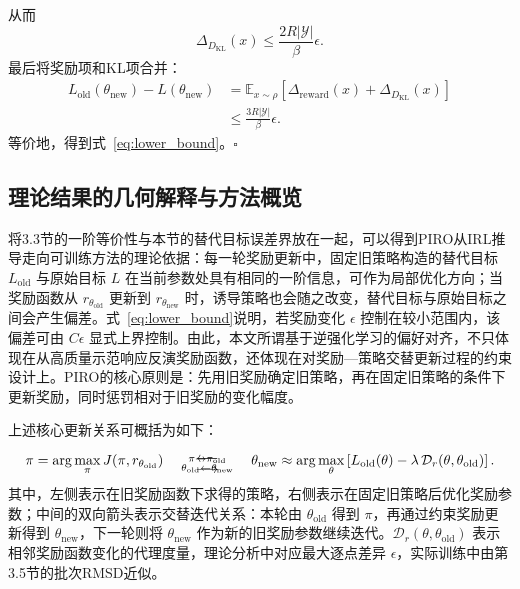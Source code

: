 从而
\begin{equation}
    \Delta_{D_{\mathrm{KL}}}(x)
    \le \frac{2R|\mathcal{Y}|}{\beta}\epsilon.
\end{equation}
最后将奖励项和KL项合并：
\begin{equation}
\begin{aligned}
    L_{\mathrm{old}}(\theta_{\mathrm{new}})-L(\theta_{\mathrm{new}})
    &=\mathbb{E}_{x\sim\rho}\left[\Delta_{\mathrm{reward}}(x)+\Delta_{D_{\mathrm{KL}}}(x)\right]\\
    &\le \frac{3R|\mathcal{Y}|}{\beta}\epsilon.
\end{aligned}
\end{equation}
等价地，得到式~\eqref{eq:lower_bound}。$\square$

\subsection{理论结果的几何解释与方法概览}

将3.3节的一阶等价性与本节的替代目标误差界放在一起，可以得到PIRO从IRL推导走向可训练方法的理论依据：每一轮奖励更新中，固定旧策略构造的替代目标 $L_{\mathrm{old}}$ 与原始目标 $L$ 在当前参数处具有相同的一阶信息，可作为局部优化方向；当奖励函数从 $r_{\theta_{\mathrm{old}}}$ 更新到 $r_{\theta_{\mathrm{new}}}$ 时，诱导策略也会随之改变，替代目标与原始目标之间会产生偏差。式~\eqref{eq:lower_bound}说明，若奖励变化 $\epsilon$ 控制在较小范围内，该偏差可由 $C\epsilon$ 显式上界控制。由此，本文所谓基于逆强化学习的偏好对齐，不只体现在从高质量示范响应反演奖励函数，还体现在对奖励—策略交替更新过程的约束设计上。PIRO的核心原则是：先用旧奖励确定旧策略，再在固定旧策略的条件下更新奖励，同时惩罚相对于旧奖励的变化幅度。

上述核心更新关系可概括为如下：
\begin{equation}
\pi
=
\arg\max_{\pi}J(\pi,r_{\theta_{\mathrm{old}}})
\quad
\mathrel{\begin{array}{@{}c@{}}
\overset{\pi\to\pi_{\mathrm{old}}\vphantom{\big|}}{\longrightarrow}\\[-20pt]
\underset{\theta_{\mathrm{old}}\leftarrow\theta_{\mathrm{new}}}{\longleftarrow}
\end{array}}
\quad
\theta_{\mathrm{new}}
\approx
\arg\max_{\theta}
\left[
L_{\mathrm{old}}(\theta)
-
\lambda\,\mathcal{D}_{r}(\theta,\theta_{\mathrm{old}})
\right].
\end{equation}
其中，左侧表示在旧奖励函数下求得的策略，右侧表示在固定旧策略后优化奖励参数；中间的双向箭头表示交替迭代关系：本轮由 $\theta_{\mathrm{old}}$ 得到 $\pi$，再通过约束奖励更新得到 $\theta_{\mathrm{new}}$，下一轮则将 $\theta_{\mathrm{new}}$ 作为新的旧奖励参数继续迭代。$\mathcal{D}_{r}(\theta,\theta_{\mathrm{old}})$ 表示相邻奖励函数变化的代理度量，理论分析中对应最大逐点差异 $\epsilon$，实际训练中由第3.5节的批次RMSD近似。

